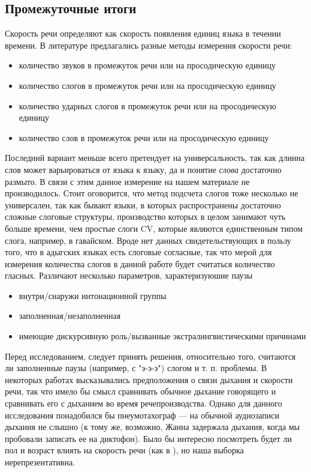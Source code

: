 \subsection{Промежуточные итоги}
\begin{itemize}
\mytem Скорость речи определяют как скорость появления единиц языка в течении времени. В литературе предлагались разные методы измерения скорости речи:
\begin{itemize}
\item количество звуков в промежуток речи или на просодическую единицу
\item количество слогов в промежуток речи или на просодическую единицу
\item количество ударных слогов в промежуток речи или на просодическую единицу
\item количество слов в промежуток речи или на просодическую единицу
\end{itemize}
Последний вариант меньше всего претендует на универсальность, так как длинна слов может варьироваться от языка к языку, да и понятие \textit{слова} достаточно размыто. В связи с этим данное измерение на нашем материале не производилось. Стоит оговорится, что метод подсчета слогов тоже несколько не универсален, так как бывают языки, в которых распространены достаточно сложные слоговые структуры, производство которых в целом занимают чуть больше времени, чем простые слоги CV, которые являются единственным типом слога, например, в гавайском.
\mytem Вроде нет данных свидетельствующих в пользу того, что в адыгских языках есть слоговые согласные, так что мерой для измерения количества слогов в данной работе будет считаться количество гласных.
\mytem Различают несколько параметров, характеризуюшие паузы
\begin{itemize}
\item внутри/снаружи интонационной группы
\item заполненная/незаполненная
\item имеющие дискурсивную роль/вызванные экстралингвистическими причинами
\end{itemize}
Перед исследованием, следует принять решения, относительно того, считаются ли заполненные паузы (например, с "э-э-э") слогом и т. п. проблемы.
\mytem В некоторых работах высказывались предположения о связи дыхания и скорости речи, так что имело бы смысл сравнивать обычное дыхание говорящего и сравнивать его с дыханием во время речепроизводства. Однако для данного исследования понадобился бы пнеумотахограф --- на обычной  аудиозаписи дыхания не слышно (к тому же, возможно, Жанна задержала дыхания, когда мы пробовали записать ее на диктофон).
\mytem Было бы интересно посмотреть будет ли пол и возраст влиять на скорость речи (как в \citep{stepanova11}), но наша выборка нерепрезентативна.
\end{itemize}
